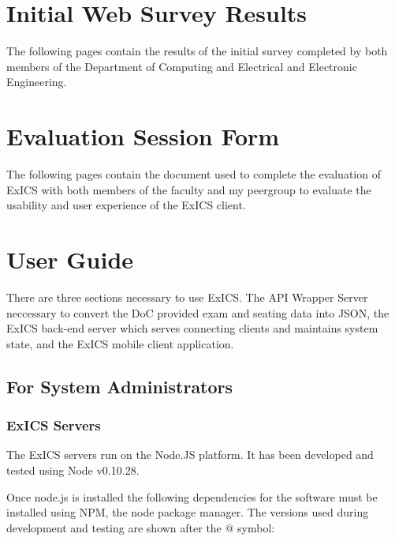 \label{ch:appendix}

\chapter{Initial Web Survey Results}
\label{ch:survey_results}

The following pages contain the results of the initial survey completed by both members of the Department of Computing and Electrical and Electronic Engineering.



\chapter{Evaluation Session Form}
\label{ch:exics_eval_doc}

The following pages contain the document used to complete the evaluation of ExICS with both members of the faculty and my peergroup to evaluate the usability and user experience of the ExICS client.



\chapter{User Guide}
\label{ch:user_guide}

There are three sections necessary to use ExICS.  The API Wrapper Server neccessary to convert the DoC provided exam and seating data into JSON, the ExICS back-end server which serves connecting clients and maintains system state, and the ExICS mobile client application.

\section{For System Administrators}

\subsection{ExICS Servers}

The ExICS servers run on the Node.JS platform.  It has been developed and tested using Node v0.10.28.

Once node.js is installed the following dependencies for the software must be installed using NPM, the node package manager.  The versions used during development and testing are shown after the @ symbol:

